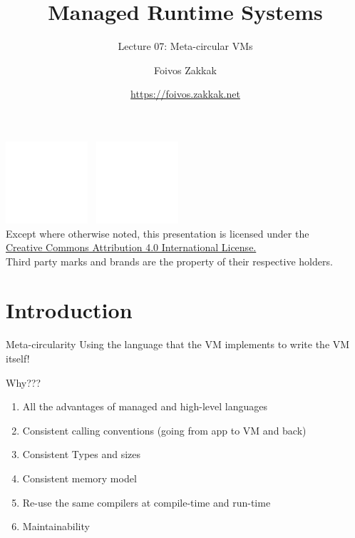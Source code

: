 \documentclass[
14pt,
aspectratio=169,
usenames,
dvipsnames,
x11names]{beamer}
\title{Managed Runtime Systems}
\subtitle{Lecture 07: Meta-circular VMs}
\author[\url{https://foivos.zakkak.net}]{Foivos Zakkak}
\date{\url{https://foivos.zakkak.net}}
\begin{document}


\begin{frame}[plain]
  \titlepage
  \centering
  \includegraphics[height=.75cm]{cc}~
  \includegraphics[height=.75cm]{by}\\[1em]
  \scriptsize{Except where otherwise noted, this presentation is licensed under the\\
    \href{http://creativecommons.org/licenses/by/4.0/}%
    {Creative Commons Attribution 4.0 International License.}\\[1ex]
    Third party marks and brands are the property of their respective
    holders.}
\end{frame}


\section{Introduction}

\begin{frame}{Meta-circularity}
  Using the language that the VM implements to write the VM itself!
\end{frame}

\begin{frame}{Why???}
  \begin{enumerate}
  \item All the advantages of managed and high-level languages
  \item Consistent calling conventions (going from app to VM and back)
  \item Consistent Types and sizes
  \item Consistent memory model
  \item Re-use the same compilers at compile-time and run-time
  \item Maintainability
  \end{enumerate}
\end{frame}
\end{document}
